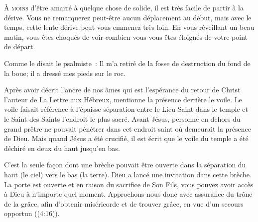 \lettrine{À}{ moins} d'être amarré à quelque chose de solide,
 il est très facile de partir à la dérive.
 Vous ne remarquerez peut-être aucun déplacement au début,
 mais avec le temps, cette lente dérive peut vous emmenez très loin.
 En vous réveillant un beau matin, vous êtes choqués de voir
 combien vous vous êtes éloignés de votre point de départ. 

Comme le disait le psalmiste~: 
 \Og Il m'a retiré de la fosse de destruction du fond de la boue;
 il a dressé mes pieds sur le roc. \Fg{}


Après avoir décrit l'ancre de nos âmes
 \ocadr qui est l'espérance du retour de Christ \fcadr{}
 l'auteur de La Lettre aux Hébreux, mentionne la présence derrière le voile.
 Le voile faisait référence à l'épaisse séparation entre le Lieu Saint
 dans le temple et le Saint des Saints \ocadr l'endroit le plus sacré.
 Avant Jésus, personne en dehors du grand prêtre 
 ne pouvait pénétrer
 dans cet endroit saint où demeurait la présence de Dieu.
 Mais quand Jésus a été crucifié, il est écrit que le voile du temple
 a été déchiré en deux du haut jusqu'en bas.

C'est la seule fa\c{c}on dont une brèche pouvait être ouverte
 dans la séparation \ocadr du haut (le ciel) vers le bas (la terre).
 Dieu a lancé une invitation dans cette brèche. La porte est ouverte
 et en raison du sacrifice de Son Fils, vous pouvez avoir accès à Dieu
 à n'importe quel moment.
 \Og Approchons-nous donc avec assurance du trône de la grâce,
 afin d'obtenir miséricorde et de trouver grâce,
 en vue d'un secours opportun \Fg{} ((4:16)). 

\dvrule







